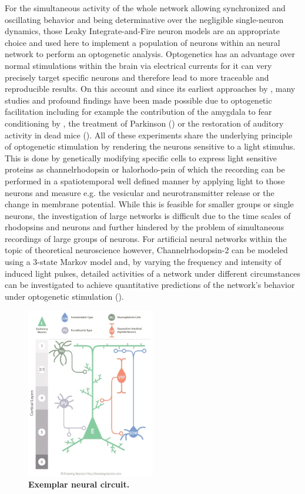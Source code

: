 \documentclass[14pt]{SelfArx} %
\numberwithin{equation}{section}
\begin{document}
\newline
For the simultaneous activity of the whole network allowing synchronized and oscillating behavior and being determinative over the negligible single-neuron dynamics, those Leaky Integrate-and-Fire neuron models are an appropriate choice and used here to implement a population of neurons within an neural network to perform an optogenetic analysis. \newline
Optogenetics has an advantage over normal stimulations within the brain via electrical currents for it can very precisely target specific neurons and therefore lead to more traceable and reproducible results. On this account and since its earliest approaches by \cite{zemelman}, many studies and profound findings have been made possible due to optogenetic facilitation including for example the contribution of the amygdala to fear conditioning by \cite{Haubensak}, the treatment of Parkinson (\cite{gradinaru}) or the restoration of auditory activity in dead mice (\cite{hermandez}). \newline
All of these experiments share the underlying principle of optogenetic stimulation by rendering the neurons sensitive to a light stimulus. This is done by genetically modifying specific cells to express light sensitive proteins as channelrhodopsin or halorhodo-psin of which the recording can be performed in a spatiotemporal well defined manner by applying light to those neurons and measure e.g. the vesicular and neurotransmitter release or the change in membrane potential. While this is feasible for smaller groups or single neurons, the investigation of large networks is difficult due to the time scales of rhodopsins and neurons and further hindered by the problem of simultaneous recordings of large groups of neurons. For artificial neural networks within the topic of theoretical neuroscience however, Channelrhodopsin-2 can be modeled using a 3-state Markov model and, by varying the frequency and intensity of induced light pulses, detailed activities of a network under different circumstances can be investigated to achieve quantitative predictions of the network's behavior under optogenetic stimulation (\cite{jannik}).\newline
\begin{figure} [h]
\centering
\includegraphics[width = 0.5\textwidth]{brainnetwork.png}
\caption{\textbf{Exemplar neural circuit.}}
\label{fig:brainnetwork}
\end{figure}
\end{document}
